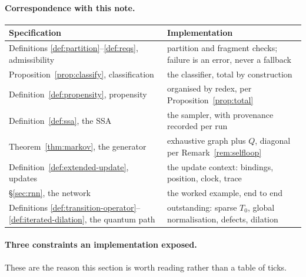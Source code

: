 \documentclass[11pt,a4paper]{article}
\theoremstyle{plain}
\theoremstyle{definition}
\theoremstyle{remark}
\begin{document}
\paragraph{Correspondence with this note.}
\begin{center}
\begin{tabular}{@{}>{\raggedright\arraybackslash}p{}>{\raggedright\arraybackslash}p{}@{}}
\toprule
Specification & Implementation \\
\midrule
Definitions \ref{def:partition}--\ref{def:reqs}, admissibility & partition and fragment checks; failure is an error, never a fallback \\
Proposition~\ref{prop:classify}, classification & the classifier, total by construction \\
Definition~\ref{def:propensity}, propensity & organised by redex, per Proposition~\ref{prop:total} \\
Definition~\ref{def:ssa}, the SSA & the sampler, with provenance recorded per run \\
Theorem~\ref{thm:markov}, the generator & exhaustive graph plus $Q$, diagonal per Remark~\ref{rem:selfloop} \\
Definition~\ref{def:extended-update}, updates & the update context: bindings, position, clock, trace \\
\S\ref{sec:rnn}, the network & the worked example, end to end \\
Definitions \ref{def:transition-operator}--\ref{def:iterated-dilation}, the quantum path & outstanding: sparse $T_0$, global normalisation, defects, dilation \\
\bottomrule
\end{tabular}
\end{center}

\paragraph{Three constraints an implementation exposed.} These are the reason this section is worth
reading rather than a table of ticks.
\end{document}

